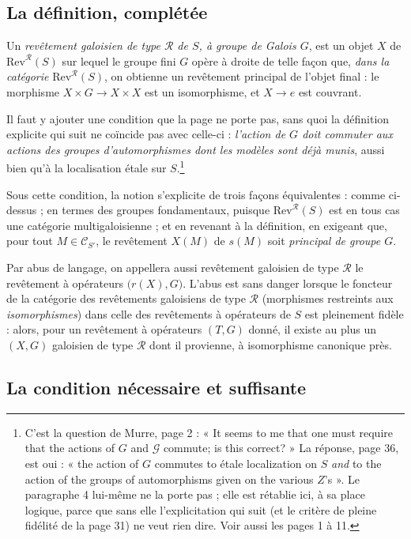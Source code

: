 \documentclass[11pt,a4paper]{article}
\begin{document}
\subsection*{La définition, complétée}

Un \emph{revêtement galoisien de type $\mathcal{R}$ de $S$, à groupe de Galois
$G$}, est un objet $X$ de $\mathrm{Rev}^{\mathcal{R}}(S)$ sur lequel le groupe
fini $G$ opère à droite de telle façon que, \emph{dans la catégorie}
$\mathrm{Rev}^{\mathcal{R}}(S)$, on obtienne un revêtement principal de l'objet
final : le morphisme $X \times G \to X \times X$ est un isomorphisme, et
$X \to e$ est couvrant.

Il faut y ajouter une condition que la page ne porte pas, sans quoi la
définition explicite qui suit ne coïncide pas avec celle-ci : \emph{l'action de
$G$ doit commuter aux actions des groupes d'automorphismes dont les modèles
sont déjà munis}, aussi bien qu'à la localisation étale sur $S$.\footnote{C'est
la question de Murre, page 2 : « It seems to me that one must require that the
actions of $G$ and $\mathcal{G}$ commute; is this correct? » La réponse, page
36, est oui : « the action of $G$ commutes to étale localization on $S$
\emph{and} to the action of the groups of automorphisms given on the various
$Z$'s ». Le paragraphe 4 lui-même ne la porte pas ; elle est rétablie ici, à sa
place logique, parce que sans elle l'explicitation qui suit (et le critère
de pleine fidélité de la page 31) ne veut rien dire. Voir aussi les
pages 1 à 11.}

Sous cette condition, la notion s'explicite de trois façons équivalentes :
comme ci-dessus ; en termes des groupes fondamentaux, puisque
$\mathrm{Rev}^{\mathcal{R}}(S)$ est en tous cas une catégorie
multigaloisienne ; et en revenant à la définition, en exigeant que, pour tout
$M \in \mathcal{C}_{S'}$, le revêtement $X(M)$ de $s(M)$ soit \emph{principal
de groupe $G$}.

Par abus de langage, on appellera aussi revêtement galoisien de type
$\mathcal{R}$ le revêtement à opérateurs $\bigl(r(X), G\bigr)$. L'abus est sans
danger lorsque le foncteur de la catégorie des revêtements galoisiens de type
$\mathcal{R}$ (morphismes restreints aux \emph{isomorphismes}) dans celle
des revêtements à opérateurs de $S$ est pleinement fidèle : alors, pour un
revêtement à opérateurs $(T,G)$ donné, il existe au plus un $(X,G)$ galoisien
de type $\mathcal{R}$ dont il provienne, à isomorphisme canonique près.

\subsection*{La condition nécessaire et suffisante}
\end{document}
